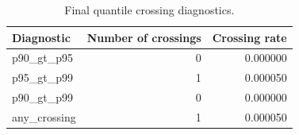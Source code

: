 \begin{table}
\caption{Final quantile crossing diagnostics.}
\label{tab:09-final-quantile-crossing-summary}
\begin{tabular}{lrr}
\toprule
Diagnostic & Number of crossings & Crossing rate \\
\midrule
p90_gt_p95 & 0 & 0.000000 \\
p95_gt_p99 & 1 & 0.000050 \\
p90_gt_p99 & 0 & 0.000000 \\
any_crossing & 1 & 0.000050 \\
\bottomrule
\end{tabular}
\end{table}
